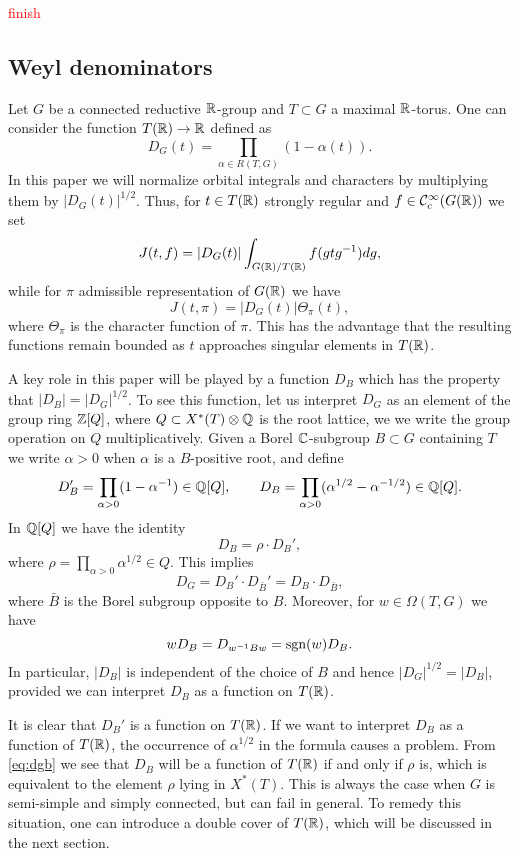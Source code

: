 \documentclass{article}
\theoremstyle{definition}
\numberwithin{equation}{section}
\renewcommand{\-}{\hyp{}}
\begin{document}
\textcolor{red}{finish}

\subsection{Weyl denominators} \label{sub:weyldenom}

Let $G$ be a connected reductive $\mathbb{R}$-group and $T \subset G$ a maximal $\mathbb{R}$-torus. One can consider the function $T(\mathbb{R}) \to \mathbb{R}$ defined as
\[ D_G(t) = \textstyle\prod\limits_{\alpha \in R(T,G)} (1-\alpha(t)). \]
In this paper we will normalize orbital integrals and characters by multiplying them by $|D_G(t)|^{1/2}$. Thus, for $t \in T(\mathbb{R})$ strongly regular and $f \in \mathcal{C}_c^\infty(G(\mathbb{R}))$ we set
\[ J(t,f) = |D_G(t)|\int_{G(\mathbb{R})/T(\mathbb{R})} f(gtg^{-1})dg, \]
while for $\pi$ admissible representation of $G(\mathbb{R})$ we have
\[ J(t,\pi) = |D_G(t)|\Theta_\pi(t), \]
where $\Theta_\pi$ is the character function of $\pi$. This has the advantage that the resulting functions remain bounded as $t$ approaches singular elements in $T(\mathbb{R})$.

A key role in this paper will be played by a function $D_B$ which has the property that $|D_B|=|D_G|^{1/2}$. To see this function, let us interpret $D_G$ as an element of the group ring $\mathbb{Z}[Q]$, where $Q \subset X^*(T)\otimes\mathbb{Q}$ is the root lattice, we we write the group operation on $Q$ multiplicatively. Given a Borel $\mathbb{C}$-subgroup $B \subset G$ containing $T$ we write $\alpha>0$ when $\alpha$ is a $B$-positive root, and define
\begin{equation} \label{eq:weyldenom}
D_B' = \prod_{\alpha>0} (1-\alpha^{-1}) \in \mathbb{Q}[Q],\qquad D_B = \prod_{\alpha>0} (\alpha^{1/2}-\alpha^{-1/2}) \in \mathbb{Q}[Q].
\end{equation}
In $\mathbb{Q}[Q]$ we have the identity
\begin{equation} \label{eq:dgb}
D_B = \rho \cdot D_B',	
\end{equation}
where $\rho=\prod_{\alpha>0} \alpha^{1/2} \in Q$. This implies
\[ D_G = D_B' \cdot D_{\bar B}' = D_B \cdot D_{\bar B}, \]
where $\bar B$ is the Borel subgroup opposite to $B$. Moreover, for $w \in \Omega(T,G)$ we have
\begin{equation} \label{eq:wsd}
wD_B = D_{w^{-1}Bw} = \textrm{sgn}(w)D_B.	
\end{equation}
In particular, $|D_B|$ is independent of the choice of $B$ and hence $|D_G|^{1/2}=|D_B|$, provided we can interpret $D_B$ as a function on $T(\mathbb{R})$.

It is clear that $D_B'$ is a function on $T(\mathbb{R})$. If we want to interpret $D_B$ as a function of $T(\mathbb{R})$, the occurrence of $\alpha^{1/2}$ in the formula causes a problem. From \eqref{eq:dgb} we see that $D_B$ will be a function of $T(\mathbb{R})$ if and only if $\rho$ is, which is equivalent to the element $\rho$ lying in $X^*(T)$. This is always the case when $G$ is semi-simple and simply connected, but can fail in general. To remedy this situation, one can introduce a double cover of $T(\mathbb{R})$, which will be discussed in the next section.
\end{document}
